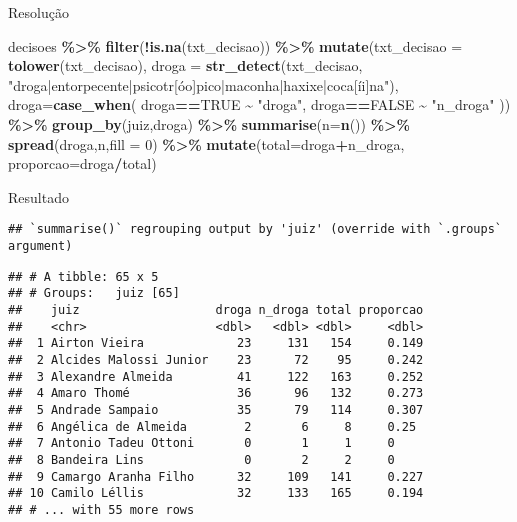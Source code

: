 \documentclass[
  10pt,
  ignorenonframetext,
]{beamer}
\newenvironment{Shaded}{\begin{snugshade}}{\end{snugshade}}
\newcommand{\DataTypeTok}[1]{\textcolor[rgb]{0.13,0.29,0.53}{#1}}
\newcommand{\DecValTok}[1]{\textcolor[rgb]{0.00,0.00,0.81}{#1}}
\newcommand{\KeywordTok}[1]{\textcolor[rgb]{0.13,0.29,0.53}{\textbf{#1}}}
\newcommand{\NormalTok}[1]{#1}
\newcommand{\OperatorTok}[1]{\textcolor[rgb]{0.81,0.36,0.00}{\textbf{#1}}}
\newcommand{\OtherTok}[1]{\textcolor[rgb]{0.56,0.35,0.01}{#1}}
\newcommand{\StringTok}[1]{\textcolor[rgb]{0.31,0.60,0.02}{#1}}
\begin{document}
\begin{frame}[fragile]{Resolução}
\protect\hypertarget{resoluuxe7uxe3o-1}{}
\begin{Shaded}
\begin{Highlighting}[]
\NormalTok{decisoes }\OperatorTok{\%\textgreater{}\%}\StringTok{ }
\StringTok{  }\KeywordTok{filter}\NormalTok{(}\OperatorTok{!}\KeywordTok{is.na}\NormalTok{(txt\_decisao)) }\OperatorTok{\%\textgreater{}\%}
\StringTok{  }\KeywordTok{mutate}\NormalTok{(}\DataTypeTok{txt\_decisao =} \KeywordTok{tolower}\NormalTok{(txt\_decisao),}
         \DataTypeTok{droga =} \KeywordTok{str\_detect}\NormalTok{(txt\_decisao,}
    \StringTok{"droga|entorpecente|psicotr[óo]pico|maconha|haxixe|coca[íi]na"}\NormalTok{),}
    \DataTypeTok{droga=}\KeywordTok{case\_when}\NormalTok{(}
\NormalTok{      droga}\OperatorTok{==}\OtherTok{TRUE} \OperatorTok{\textasciitilde{}}\StringTok{ "droga"}\NormalTok{,}
\NormalTok{      droga}\OperatorTok{==}\OtherTok{FALSE} \OperatorTok{\textasciitilde{}}\StringTok{ "n\_droga"}
\NormalTok{    )) }\OperatorTok{\%\textgreater{}\%}
\StringTok{  }\KeywordTok{group\_by}\NormalTok{(juiz,droga) }\OperatorTok{\%\textgreater{}\%}
\StringTok{  }\KeywordTok{summarise}\NormalTok{(}\DataTypeTok{n=}\KeywordTok{n}\NormalTok{()) }\OperatorTok{\%\textgreater{}\%}
\StringTok{  }\KeywordTok{spread}\NormalTok{(droga,n,}\DataTypeTok{fill =} \DecValTok{0}\NormalTok{) }\OperatorTok{\%\textgreater{}\%}
\StringTok{  }\KeywordTok{mutate}\NormalTok{(}\DataTypeTok{total=}\NormalTok{droga}\OperatorTok{+}\NormalTok{n\_droga,}
         \DataTypeTok{proporcao=}\NormalTok{droga}\OperatorTok{/}\NormalTok{total)}
\end{Highlighting}
\end{Shaded}
\end{frame}

\begin{frame}[fragile]{Resultado}
\protect\hypertarget{resultado-1}{}
\begin{verbatim}
## `summarise()` regrouping output by 'juiz' (override with `.groups` argument)
\end{verbatim}

\begin{verbatim}
## # A tibble: 65 x 5
## # Groups:   juiz [65]
##    juiz                   droga n_droga total proporcao
##    <chr>                  <dbl>   <dbl> <dbl>     <dbl>
##  1 Airton Vieira             23     131   154     0.149
##  2 Alcides Malossi Junior    23      72    95     0.242
##  3 Alexandre Almeida         41     122   163     0.252
##  4 Amaro Thomé               36      96   132     0.273
##  5 Andrade Sampaio           35      79   114     0.307
##  6 Angélica de Almeida        2       6     8     0.25 
##  7 Antonio Tadeu Ottoni       0       1     1     0    
##  8 Bandeira Lins              0       2     2     0    
##  9 Camargo Aranha Filho      32     109   141     0.227
## 10 Camilo Léllis             32     133   165     0.194
## # ... with 55 more rows
\end{verbatim}
\end{frame}
\end{document}
